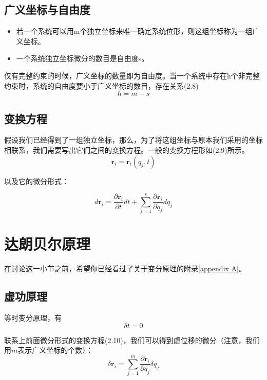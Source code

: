 \documentclass[a4paper, 10pt, openany]{book}%
\begin{document}
  \subsection{广义坐标与自由度}
  \begin{itemize}
  \item 若一个系统可以用m个独立坐标来唯一确定系统位形，则这组坐标称为一组广义坐标。

  \item 一个系统独立坐标微分的数目是自由度s。
  \end{itemize}
   
   仅有完整约束的时候，广义坐标的数量即为自由度。当一个系统中存在h个非完整约束时，系统的自由度要小于广义坐标的数目，存在关系(2.8)
   \begin{equation}
    h=m-s
   \end{equation}
   

   \subsection{变换方程}

   假设我们已经得到了一组独立坐标，那么，为了将这组坐标与原本我们采用的坐标相联系，我们需要写出它们之间的变换方程。一般的变换方程形如(2.9)所示。
   \begin{equation}
    \textbf{r}_i=\textbf{r}_i(q_j,t)
   \end{equation}

   以及它的微分形式：

   \begin{equation}
    d\textbf{r}_i=\frac{\partial \textbf{r}_i}{\partial t}dt+\sum_{j=1}^s \frac{\partial \textbf{r}_i}{\partial q_j}dq_j
   \end{equation}
   \section{达朗贝尔原理}
   \label{2.2}
  在讨论这一小节之前，希望你已经看过了关于变分原理的附录\ref{appendix A}。
   \subsection{虚功原理}
   
   等时变分原理，有
   \begin{equation}
    \delta t=0
   \end{equation}
   
   联系上前面微分形式的变换方程(2.10)，我们可以得到虚位移的微分（注意，我们用$m$表示广义坐标的个数）：
   \begin{equation}
    \delta \textbf{r}_i=\sum_{j=1}^m \frac{\partial \textbf{r}_i}{\partial q_j}\delta q_j
   \end{equation}
\end{document}
